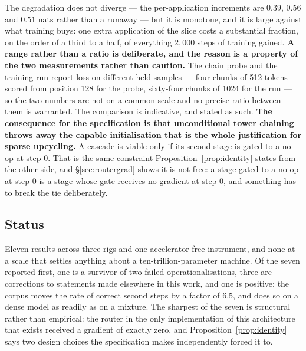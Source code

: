 \documentclass[11pt]{article}
\begin{document}
The degradation does not diverge --- the per-application increments are $0.39$, $0.56$ and $0.51$ nats rather than a runaway --- but it is monotone, and it is large against what training buys: one extra application of the slice costs a substantial fraction, on the order of a third to a half, of everything $2{,}000$ steps of training gained. \textbf{A range rather than a ratio is deliberate, and the reason is a property of the two measurements rather than caution.} The chain probe and the training run report loss on different held samples --- four chunks of 512 tokens scored from position 128 for the probe, sixty-four chunks of 1024 for the run --- so the two numbers are not on a common scale and no precise ratio between them is warranted. The comparison is indicative, and stated as such. \textbf{The consequence for the specification is that unconditional tower chaining throws away the capable initialisation that is the whole justification for sparse upcycling.} A cascade is viable only if its second stage is gated to a no-op at step 0. That is the same constraint Proposition~\ref{prop:identity} states from the other side, and \S\ref{sec:routergrad} shows it is not free: a stage gated to a no-op at step 0 is a stage whose gate receives no gradient at step 0, and something has to break the tie deliberately.

\subsection{Status}

Eleven results across three rigs and one accelerator-free instrument, and none at a scale that settles anything about a ten-trillion-parameter machine. Of the seven reported first, one is a survivor of two failed operationalisations, three are corrections to statements made elsewhere in this work, and one is positive: the corpus moves the rate of correct second steps by a factor of $6.5$, and does so on a dense model as readily as on a mixture. The sharpest of the seven is structural rather than empirical: the router in the only implementation of this architecture that exists received a gradient of exactly zero, and Proposition~\ref{prop:identity} says two design choices the specification makes independently forced it to.
\end{document}
